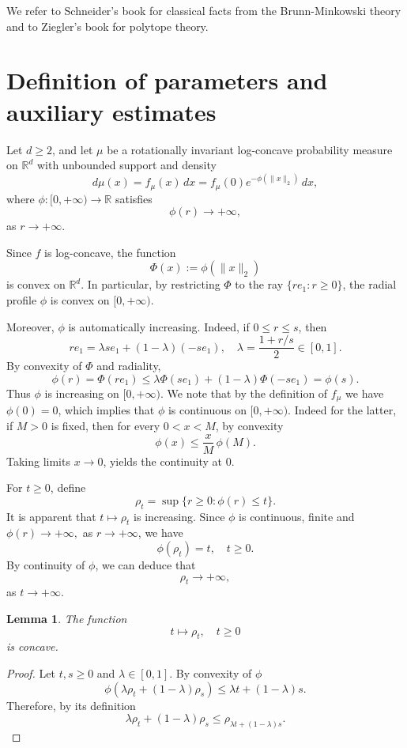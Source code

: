 \documentclass[10pt]{amsart}
\newcommand{\1}{\textbf{1}}
\numberwithin{equation}{section} %
\newtheorem{lemma}[theorem]{Lemma}
\theoremstyle{remark}
\theoremstyle{definition}
\begin{document}
We refer to Schneider's book \cite{Schneider-book} for classical facts from the Brunn-Minkowski theory and to Ziegler's book \cite{Ziegler-book} for polytope theory.




\section{Definition of parameters and auxiliary estimates}

Let \(d\ge 2\), and let \(\mu\) be a rotationally invariant log-concave probability
measure on \(\mathbb R^d\) with unbounded support and density
\[
d\mu(x)=f_\mu(x)\,dx= f_\mu(0)e^{-\phi(\|x\|_2)}\,dx,
\]
where \(\phi:[0,+\infty)\to\mathbb R\)  satisfies
\[
\phi(r)\to+\infty ,\] as $ r\to+\infty$.

Since \(f\) is log-concave, the function
\[
\Phi(x):=\phi(\|x\|_2)
\]
is convex on \(\mathbb R^d\). In particular, by restricting \(\Phi\) to the ray
\(\{re_1:r\ge0\}\), the radial profile \(\phi\) is convex on \([0,+\infty)\). 

Moreover, \(\phi\) is automatically increasing. Indeed, if \(0\le r\le s\), then
\[
re_1=\lambda se_1+(1-\lambda)(-se_1),
\quad
\lambda=\frac{1+r/s}{2}\in[0,1].
\]
By convexity of \(\Phi\) and radiality,
\[
\phi(r)=\Phi(re_1)
\le
\lambda\Phi(se_1)+(1-\lambda)\Phi(-se_1)
=
\phi(s).
\]
Thus \(\phi\) is increasing on \([0,+\infty)\). We note that by the definition of $f_\mu$ we have $\phi(0)=0$, which implies that $\phi$ is continuous on $[0,+\infty)$. Indeed for the latter, if $M>0$ is fixed, then for every $0<x<M$, by convexity \[\phi(x) \leq \frac{x}{M}\,\phi(M).\] Taking limits $x \to 0$, yields the continuity at $0$.

For $t \geq 0$, define \[\rho_t=\sup\{r \geq 0: \phi(r) \leq t\}.\] It is apparent that $t \mapsto \rho_t$ is increasing. Since $\phi$ is continuous, finite and $\phi(r) \to +\infty,$ as $r \to +\infty$, we have \[\phi(\rho_t)=t, \quad t \geq 0.\] By continuity of $\phi$, we can deduce that \[\rho_t \to +\infty, \] as $t \to +\infty.$

\begin{lemma}\label{lem:rho-concave}
    The function \[t \mapsto \rho_t, \quad t \geq0\] is concave.
\end{lemma}

\begin{proof} 
    Let $t,s\geq 0$ and $\lambda \in [0,1]$. By convexity of $\phi$
    \[\phi(\lambda \rho_t+(1-\lambda)\rho_s ) \leq \lambda t+(1-\lambda)s.\] Therefore, by its definition \[\lambda\rho_t+(1-\lambda)\rho_s \leq \rho_{\lambda t+(1-\lambda)s}.\]
\end{proof}
\end{document}
